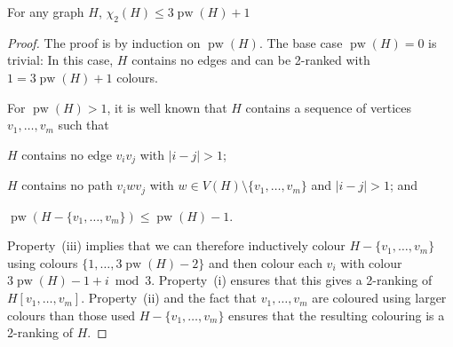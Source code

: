 \documentclass[kpfonts]{patmorin}
\DeclareMathOperator{\pw}{pw}
\newcommand{\trn}{\chi_2}
\newcommand{\htrn}{\hat{\chi}_2}
\theoremstyle{named}
\begin{document}
%
%


\begin{lem}\label{pathwidth}
    For any graph $H$, $\trn(H)\le 3\pw(H) + 1$
\end{lem}

\begin{proof}
    The proof is by induction on $\pw(H)$.  The base case $\pw(H)=0$ is trivial: In this case, $H$ contains no edges and can be 2-ranked with $1 = 3\pw(H)+1$ colours.

    For $\pw(H)>1$, it is well known that $H$ contains a sequence of vertices $v_1,\ldots,v_m$  such that
    \begin{inparaenum}[(i)]
        \item $H$ contains no edge $v_iv_j$ with $|i-j|>1$;
        \item $H$ contains no path $v_iw v_j$ with $w\in V(H)\setminus\{v_1,\ldots,v_m\}$ and $|i-j|>1$; and
        \item $\pw(H-\{v_1,\ldots,v_m\})\le \pw(H)-1$.
    \end{inparaenum}
    Property~(iii) implies that we can therefore inductively colour $H-\{v_1,\ldots,v_m\}$ using colours $\{1,\ldots,3\pw(H)-2\}$ and then colour each $v_i$ with colour $3\pw(H)-1+i\bmod 3$.  Property~(i) ensures that this gives a 2-ranking of $H[v_1,\ldots,v_m]$.  Property~(ii) and the fact that $v_1,\ldots,v_m$ are coloured using larger colours than those used $H-\{v_1,\ldots,v_m\}$ ensures that the resulting colouring is a 2-ranking of $H$.
\end{proof}
\end{document}
